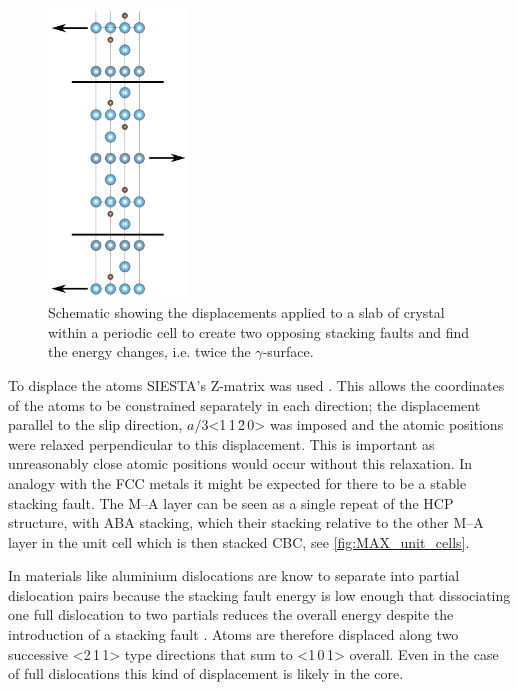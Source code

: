 \begin{figure}
\centering
\captionsetup{width=0.45\textwidth}
\includegraphics[width=0.3333\textwidth]{displacements_for_gamma_surface}
\caption[Schematic displacements during the simulation of the \texorpdfstring{$\gamma$}{gamma}-surface.]{Schematic showing the displacements applied to a slab of crystal within a periodic cell to create two opposing stacking faults and find the energy changes, i.e. twice the $\gamma$-surface. \label{fig:DFT_gamma_surface}}
\end{figure}

To displace the atoms SIESTA's Z-matrix was used \cite{SIESTA_manual}. This allows the coordinates of the atoms to be constrained separately in each direction; the displacement parallel to the slip direction, $a/3$<1\,1\,\={2}\,0> was imposed and the atomic positions were relaxed perpendicular to this displacement. This is important as unreasonably close atomic positions would occur without this relaxation. In analogy with the FCC metals it might be expected for there to be a stable stacking fault. The M--A layer can be seen as a single repeat of the HCP structure, with ABA stacking, which their stacking relative to the other M--A layer in the unit cell which is then stacked CBC, see \autoref{fig:MAX_unit_cells}. 

In materials like aluminium dislocations are know to separate into partial dislocation pairs because the stacking fault energy is low enough that dissociating one full dislocation to two partials reduces the overall energy despite the introduction of a stacking fault \cite{kelly2012ch9}. Atoms are therefore displaced along two successive <2\,1\,1> type directions that sum to <1\,0\,1> overall. Even in the case of full dislocations this kind of displacement is likely in the core.


